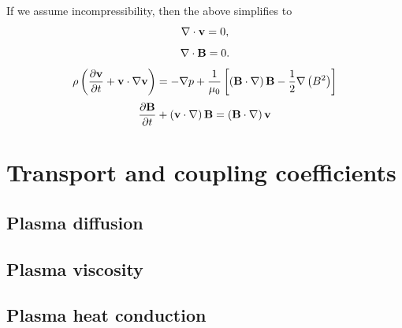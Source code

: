 \documentclass[a4paper,11pt]{report}
\begin{document}
If we assume incompressibility, then the above simplifies to
\begin{equation}
    \nabla \cdot \mathbf{v} = 0,
\end{equation}
\begin{equation}
    \nabla \cdot \mathbf{B} = 0.
    \end{equation}
\begin{equation}
    \rho \left (\frac{\partial \mathbf{v}}{\partial t} + \mathbf{v} \cdot \nabla \mathbf{v} \right ) = - \nabla p  + \frac{1}{\mu_0} \left [ \left ( \mathbf{B} \cdot \nabla \right ) \mathbf{B} - \frac{1}{2} \nabla \left ( B^2 \right ) \right ]
\end{equation}
\begin{equation}
    \frac{\partial \mathbf{B}}{\partial t} + \left ( \mathbf{v} \cdot \nabla \right ) \mathbf{B} = \left ( \mathbf{B} \cdot \nabla \right ) \mathbf{v}
\end{equation}

\chapter{Transport and coupling coefficients}

\section{Plasma diffusion}

\section{Plasma viscosity}

\section{Plasma heat conduction}

\end{document}
